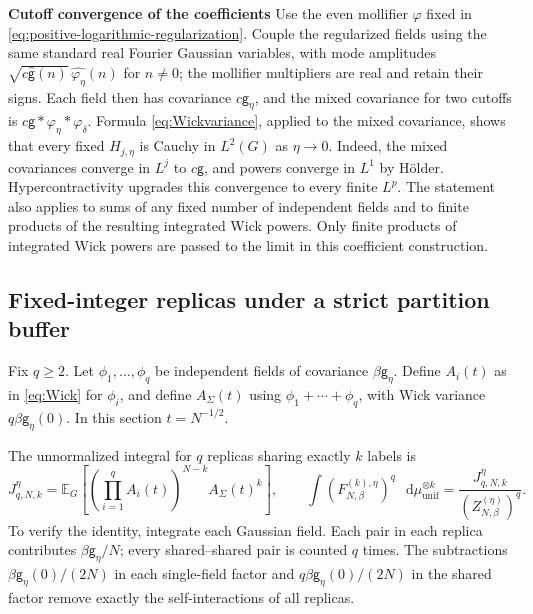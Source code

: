\documentclass[11pt,reqno]{amsart}
\numberwithin{equation}{section}
\theoremstyle{plain}
\theoremstyle{definition}
\newcommand{\dd}{\mathop{}\!\mathrm d}
\newcommand{\E}{\mathbb E}
\newcommand{\be}{\beta}
\newcommand{\g}{\mathsf g}
\newcommand{\muunif}{\mu_{\mathrm{unif}}}
\newcommand{\step}[1]{\par\medskip\noindent\textbf{#1}}
\begin{document}
\step{Cutoff convergence of the coefficients} Use the even mollifier $\varphi$ fixed in \eqref{eq:positive-logarithmic-regularization}. Couple the regularized fields using the same standard real Fourier Gaussian variables, with mode amplitudes $\sqrt{c\widehat{\g}(n)}\,\widehat{\varphi_\eta}(n)$ for $n\ne0$; the mollifier multipliers are real and retain their signs. Each field then has covariance $c\g_\eta$, and the mixed covariance for two cutoffs is $c\g*\varphi_\eta*\varphi_\delta$. Formula \eqref{eq:Wickvariance}, applied to the mixed covariance, shows that every fixed $H_{j,\eta}$ is Cauchy in $L^2(G)$ as $\eta\to0$. Indeed, the mixed covariances converge in $L^j$ to $c\g$, and powers converge in $L^1$ by H\"older. Hypercontractivity upgrades this convergence to every finite $L^p$. The statement also applies to sums of any fixed number of independent fields and to finite products of the resulting integrated Wick powers. Only finite products of integrated Wick powers are passed to the limit in this coefficient construction.

\subsection{Fixed-integer replicas under a strict partition buffer}

Fix $q\geq2$. Let $\phi_1,\ldots,\phi_q$ be independent fields of covariance $\be \g_\eta$. Define $A_i(t)$ as in \eqref{eq:Wick} for $\phi_i$, and define $A_\Sigma(t)$ using $\phi_1+\cdots+\phi_q$, with Wick variance $q\be \g_\eta(0)$. In this section $t=N^{-1/2}$.

The unnormalized integral for $q$ replicas sharing exactly $k$ labels is
\begin{equation}\label{eq:qHS}
 J_{q,N,k}^{\eta}
 =\E_G\left[\left(\prod_{i=1}^q A_i(t)\right)^{N-k}A_\Sigma(t)^k\right],
 \qquad
 \int(F_{N,\be}^{(k),\eta})^q\,\dd \muunif^{\otimes k}
 =\frac{J_{q,N,k}^{\eta}}{(Z_{N,\be}^{(\eta)})^q}.
\end{equation}
To verify the identity, integrate each Gaussian field. Each pair in each replica contributes $\be \g_\eta/N$; every shared--shared pair is counted $q$ times. The subtractions $\be \g_\eta(0)/(2N)$ in each single-field factor and $q\be \g_\eta(0)/(2N)$ in the shared factor remove exactly the self-interactions of all replicas.
\end{document}
